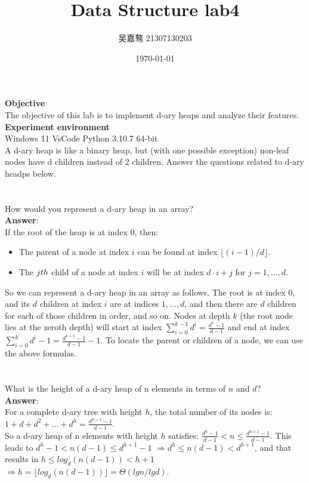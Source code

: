 \documentclass[UTF8]{ctexart}
\title{\textbf{Data Structure lab4}}
\author{吴嘉骜 21307130203}
\date{\today}
\begin{document}
\maketitle

\noindent
\textbf {Objective}\\  The objective of this lab is to implement d-ary heaps and analyze their features.\\
\noindent
\textbf {Experiment environment} \\
    Windows 11 VsCode Python 3.10.7 64-bit\\

\setlength{\parindent}{0pt}
A d-ary heap is like a binary heap, but (with one possible exception) non-leaf
nodes have d children instead of $2$ children.
Answer the questions related to d-ary headps below.
\section{}
How would you represent a d-ary heap in an array?\\
\textbf{Answer}:\\
If the root of the heap is at index 0, then:
\begin{itemize}
   \item The parent of a node at index $i$ can be found at index $\lfloor(i-1) / d \rfloor$.
   \item The $j\-th$ child of a node at index $i$ will be at index $d \cdot i + j$ for $j = 1, \ldots , d$.
\end{itemize}
So we can represent a d-ary heap in an array as follows. The root is at index $0$, and its $d$ children at index $i$ are at indices $1, \ldots , d$, and then there are $d$ children for each of those children in order, and so on.
Nodes at depth $k$ (the root node lies at the zeroth depth) will start at index $\sum\limits_{i=0}^{k-1} d^i = \frac{d^k - 1}{d - 1}$ and end at index $\sum\limits _{i=0}^{k} d^i - 1 = \frac{d^{k+1} - 1}{d - 1} - 1$.
To locate the parent or children of a node, we can use the above formulas.
\section{}
What is the height of a d-ary heap of n elements in terms of $n$ and $d$?\\
\textbf{Answer}:\\
For a complete d-ary tree with height $h$, the total number of its nodes is: $1 + d + d^2 + ... + d^h =    
\frac{d^{h+1} - 1}{d - 1}$.\\
So a d-ary heap of n elements with height $h$ satisfies: $\frac{d^{h} - 1}{d - 1} < n \leq \frac{d^{h+1} - 1}{d - 1}$. This leads to
$d^h-1<n(d-1)\leq d^{h+1}-1$  $ \Rightarrow d^h \leq n(d-1) < d^{h+1}$, and that results in $h \leq log_d(n(d-1)) < h+1$\\
$ \Rightarrow h = \lfloor log_d(n(d-1)) \rfloor = \Theta(lg n/lg d)$.
\end{document}
